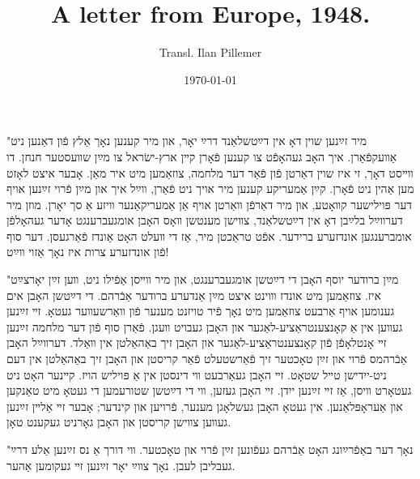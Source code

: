 \documentclass{article}
\begin{document}
\renewcommand{\abstractname}{\vspace{-\baselineskip}}
\title{A letter from Europe, 1948.}
\author{Transl. Ilan Pillemer}
\date{\today}

\maketitle
{}
\newline
\begin{pairs}

\begin{Rightside}

\begin{RTL}
\begin{hebrew}
\beginnumbering

\autopar
"מיר זײַנען שוין דאָ אין דײַטשלאַנד דרײַ יאָר, און מיר קענען נאָך אַלץ פֿון דאַנען ניט אַװעקפֿאַרן.
איך האָב געהאָפֿט צו קענען פֿאָרן קײן ארץ-ישׂראל צו מײַן שװעסטער חנחן.
דו װײסט דאָך, זי איז שוין דאַרטן פֿון פֿאַר דער מלחמה, צוזאַמען מיט איר מאַן.
אָבער איצט לאָזט מען אַהין ניט פֿאָרן.
קײַן אַמעריקע קענען מיר אויך ניט פֿאַרן, װײַל איך און מײַן פֿרוי זײַנען אויף דער פּוילישער קװאָטע, און מיר דאַרפֿן װאַרטן אויף אַן אַמעריקאַנער װיזע אַ סך יאָרן.
מוזן מיר דערװײַל בלײַבן דאָ אין דײַטשלאַנד, צװישן מענטשן װאָס האָבן אומגעברענגט אָדער געהאָלפֿן אומברענגען אונדזערע ברידער.
אפֿט טראַכטן מיר, אַז די װעלט האָט אַונדז פֿאַרגעסן. דער סוף פֿון אונדזערע צרות איז נאָך אַזוי װײַט!


"מײַן ברודער יוסף האָבן די דײַטשן אומגעברענגט, און מיר װײסן אַפֿילו ניט, װען זײַן יאָרצײַט איז.
צוזאַמען מיט אונדז װוינט איצט מײַן אַנדערע ברודער אַבֿרהם.
די דײַטשן האָבן אים גענומען אויף אַרבעט צוזאַמען מיט נאָך פֿיר טויזנט מענער פֿון װאַרשעװער געטאָ.
זײ זײַנען געװען אין אַ קאָנצענטראַציע-לאַגער און האָבן געבויט װעגן.
פֿאַרן סוף פֿון דער מלחמה זײַנען זײ אָנטלאָפֿן פֿון קאָנצענטראַציע-לאַגער און האָבן זיך באַהאַלטן אין װאַלד.
דערװײַל האָבן אַבֿרהמס פֿרוי און זײַן טאָכטער זיך פֿאַרשטעלט פֿאַר קריסטן און האָבן זיך באַהאַלטן אין דעם ניט-ייִדישן טײל שטאָט.
זײ האָבן געאַרבעט װי דינסטן אין אַ פּויליש הויז.
קײנער האָט ניט געטאָרט װיסן, אַז זײ זײַנען ייִדן.
זײ האָבן געזען, װי די דײַטשן שטורעמען די געטאָ מיט טאַנקען און אַעראָפּלאַנען.
אין געטאָ האָבן געשלאָגן מענער, פֿרויען און קינדער; אָבער זײ אַלײן זײַנען געװען צװישן קריסטן און האָבן גאָרניט געקענט טאָן.


"נאָך דער באַפֿרײַונג האָט אַבֿרהם געפֿונען זײַן פֿרוי און טאָכטער.
װי דורך אַ נס זײַנען אַלע דרײַ געבליבן לעבן.
נאָך צװײַ יאָר זײַנען זײ געקומען אַהער.

\endnumbering
\end{hebrew}
\end{RTL}
\end{Rightside}



\end{pairs}
\end{document}
